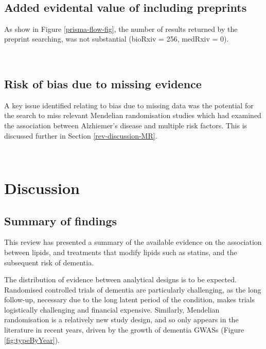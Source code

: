 \documentclass[a4paper, twoside]{templates/ociamthesis}
\begin{document}
~

\hypertarget{sys-rev-including-preprints}{%
\subsection{Added evidental value of including preprints}\label{sys-rev-including-preprints}}

As show in Figure \ref{prisma-flow-fig}, the number of results returned by the preprint searching, was not substantial (bioRxiv = 256, medRxiv = 0).

~

\hypertarget{risk-of-bias-due-to-missing-evidence-1}{%
\subsection{Risk of bias due to missing evidence}\label{risk-of-bias-due-to-missing-evidence-1}}

A key issue identified relating to bias due to missing data was the potential for the search to miss relevant Mendelian randomisation studies which had examined the association between Alzhiemer's disease and multiple risk factors. This is discussed further in Section \ref{rev-discussion-MR}.

~

\hypertarget{discussion-1}{%
\section{Discussion}\label{discussion-1}}

\hypertarget{summary-of-findings}{%
\subsection{Summary of findings}\label{summary-of-findings}}

This review has presented a summary of the available evidence on the association between lipids, and treatments that modify lipids such as statins, and the subsequent risk of dementia.

The distribution of evidence between analytical designs is to be expected. Randomised controlled trials of dementia are particularly challenging, as the long follow-up, necessary due to the long latent period of the condition, makes trials logistically challenging and financial expensive. Similarly, Mendelian randomisation is a relatively new study design, and so only appears in the literature in recent years, driven by the growth of dementia GWASs (Figure \ref{fig:typeByYear}).
\end{document}
